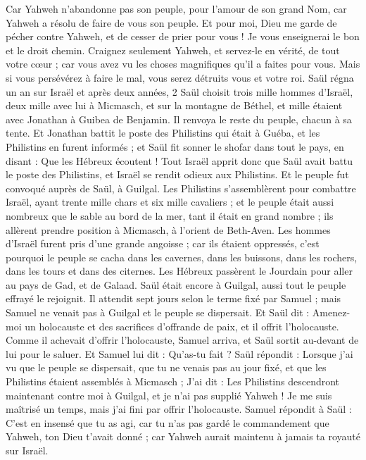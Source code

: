 \begin{multicols}{2}
Car Yahweh n’abandonne pas son peuple, pour l'amour de son grand Nom, car Yahweh a résolu de faire de vous son peuple.
Et pour moi, Dieu me garde de pécher contre Yahweh, et de cesser de prier pour vous ! Je vous enseignerai le bon et le droit chemin.
Craignez seulement Yahweh, et servez-le en vérité, de tout votre cœur ; car vous avez vu les choses magnifiques qu'il a faites pour vous.
Mais si vous persévérez à faire le mal, vous serez détruits vous et votre roi.
\VerseOne{}Saül régna un an sur Israël et après deux années, 2 Saül choisit trois mille hommes d'Israël, deux mille avec lui à Micmasch, et sur la montagne de Béthel, et mille étaient avec Jonathan à Guibea de Benjamin. Il renvoya le reste du peuple, chacun à sa tente.
Et Jonathan battit le poste des Philistins qui était à Guéba, et les Philistins en furent informés ; et Saül fit sonner le shofar dans tout le pays, en disant : Que les Hébreux écoutent !
Tout Israël apprit donc que Saül avait battu le poste des Philistins, et Israël se rendit odieux aux Philistins. Et le peuple fut convoqué auprès de Saül, à Guilgal.
Les Philistins s'assemblèrent pour combattre Israël, ayant trente mille chars et six mille cavaliers ; et le peuple était aussi nombreux que le sable au bord de la mer, tant il était en grand nombre ; ils allèrent prendre position à Micmasch, à l'orient de Beth-Aven.
Les hommes d'Israël furent pris d’une grande angoisse ; car ils étaient oppressés, c'est pourquoi le peuple se cacha dans les cavernes, dans les buissons, dans les rochers, dans les tours et dans des citernes.
Les Hébreux passèrent le Jourdain pour aller au pays de Gad, et de Galaad. Saül était encore à Guilgal, aussi tout le peuple effrayé le rejoignit.
Il attendit sept jours selon le terme fixé par Samuel ; mais Samuel ne venait pas à Guilgal et le peuple se dispersait.
Et Saül dit : Amenez-moi un holocauste et des sacrifices d’offrande de paix, et il offrit l'holocauste.
Comme il achevait d'offrir l'holocauste, Samuel arriva, et Saül sortit au-devant de lui pour le saluer.
Et Samuel lui dit : Qu'as-tu fait ? Saül répondit : Lorsque j’ai vu que le peuple se dispersait, que tu ne venais pas au jour fixé, et que les Philistins étaient assemblés à Micmasch ;
J'ai dit : Les Philistins descendront maintenant contre moi à Guilgal, et je n'ai pas supplié Yahweh ! Je me suis maîtrisé un temps, mais j'ai fini par offrir l'holocauste.
Samuel répondit à Saül : C’est en insensé que tu as agi, car tu n'as pas gardé le commandement que Yahweh, ton Dieu t'avait donné ; car Yahweh aurait maintenu à jamais ta royauté sur Israël.

\end{multicols}
